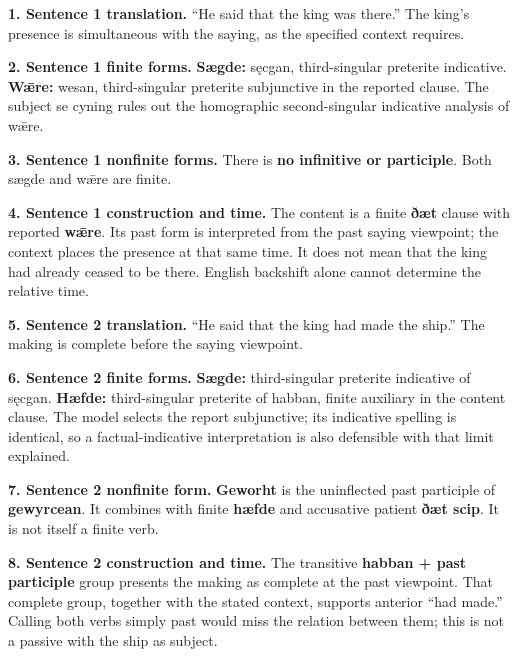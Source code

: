 \textbf{1. Sentence 1 translation.} “He said that the king was there.” The king’s presence is simultaneous with the saying, as the specified context requires.

\textbf{2. Sentence 1 finite forms.} \textbf{Sægde:} sęcgan, third-singular preterite indicative. \textbf{Wǣre:} wesan, third-singular preterite subjunctive in the reported clause. The subject se cyning rules out the homographic second-singular indicative analysis of wǣre.

\textbf{3. Sentence 1 nonfinite forms.} There is \textbf{no infinitive or participle}. Both sægde and wǣre are finite.

\textbf{4. Sentence 1 construction and time.} The content is a finite \textbf{ðæt} clause with reported \textbf{wǣre}. Its past form is interpreted from the past saying viewpoint; the context places the presence at that same time. It does not mean that the king had already ceased to be there. English backshift alone cannot determine the relative time.

\textbf{5. Sentence 2 translation.} “He said that the king had made the ship.” The making is complete before the saying viewpoint.

\textbf{6. Sentence 2 finite forms.} \textbf{Sægde:} third-singular preterite indicative of sęcgan. \textbf{Hæfde:} third-singular preterite of habban, finite auxiliary in the content clause. The model selects the report subjunctive; its indicative spelling is identical, so a factual-indicative interpretation is also defensible with that limit explained.

\textbf{7. Sentence 2 nonfinite form.} \textbf{Geworht} is the uninflected past participle of \textbf{gewyrcean}. It combines with finite \textbf{hæfde} and accusative patient \textbf{ðæt scip}. It is not itself a finite verb.

\textbf{8. Sentence 2 construction and time.} The transitive \textbf{habban + past participle} group presents the making as complete at the past viewpoint. That complete group, together with the stated context, supports anterior “had made.” Calling both verbs simply past would miss the relation between them; this is not a passive with the ship as subject.

